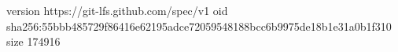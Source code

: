 version https://git-lfs.github.com/spec/v1
oid sha256:55bbb485729f86416e62195adce72059548188bcc6b9975de18b1e31a0b1f310
size 174916
